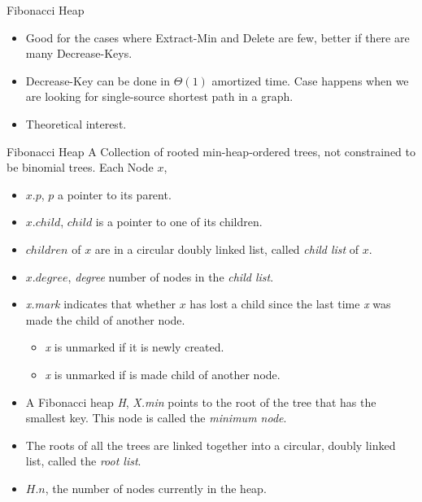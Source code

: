\documentclass{beamer}
\begin{document}
\begin{frame}{Fibonacci Heap}
\begin{itemize}
\item Good for the cases where {\sc Extract-Min} and {\sc Delete} are few, better if there are many {\sc Decrease-Key}s. 
\item {\sc Decrease-Key} can be done in $\Theta(1)$ amortized time. Case happens when we are looking for single-source shortest path in a graph. 
\item Theoretical interest. 
\end{itemize}
\end{frame}

\begin{frame}{Fibonacci Heap}
A Collection of rooted min-heap-ordered trees, not constrained to be binomial trees. Each Node $x$,
\begin{itemize}
\item $x.p$, $p$ a pointer to its parent. 
\item $x.child$, $child$ is a pointer to one of its children. 
\item $children$ of $x$ are in a circular doubly linked list, called {\it child list} of $x$. 
\item $x.degree$, {\it degree} number of nodes in the {\it child list}. 
\item {\it x.mark} indicates that whether $x$ has lost a child since the last time {\it x} was made the child of another node. 
\begin{itemize}
\item {\it x} is unmarked if it is newly created. 
\item {\it x} is unmarked if is made child of another node. 
\end{itemize}
\end{itemize}
\end{frame}

\begin{frame}{}
\begin{itemize}
\item A Fibonacci heap {\it H},  {\it X.min} points to the root of the tree that has the smallest key. This node is called
 the {\it minimum node}. 
\item The roots of all the trees are linked together into a circular, doubly linked list, called the {\it root list}. 
\item $H.n$, the number of nodes currently in the heap. 
\end{itemize}
\end{frame}
\end{document}
